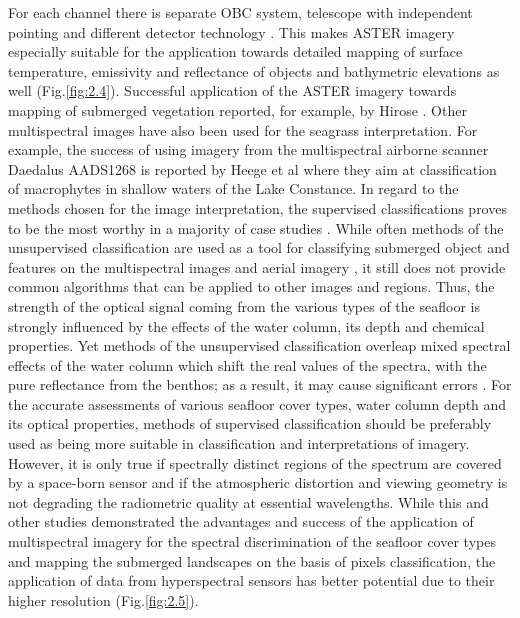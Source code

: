 \documentclass[11pt]{article}
\begin{document}
For each channel there is separate \ac{OBC} system, telescope with independent pointing and different detector technology \cite{Arai05}\label{Arai05}. 
This makes \ac{ASTER}\label{page-19} imagery especially suitable for the application towards detailed
mapping of surface temperature, emissivity and reflectance of objects and bathymetric elevations as
well (Fig.\ref{fig:2.4}). Successful application of the \ac{ASTER} imagery towards mapping of submerged vegetation
reported, for example, by Hirose \cite{Hirose04}\label{Hirose04}. 
Other multispectral images have also been used for the
seagrass interpretation. For example, the success of using imagery from the multispectral airborne
scanner Daedalus AADS1268 is reported by Heege et al \cite{Heege03}\label{Heege03} where they aim at classification of
macrophytes in shallow waters of the Lake Constance. 
In regard to the methods chosen for the image interpretation, the supervised classifications proves to
be the most worthy in a majority of case studies \cite{Palandro03,Peneva08}\label{Palandro03}\label{Peneva08}. While
often methods of the unsupervised classification are used as a tool for classifying submerged object
and features on the multispectral images and aerial imagery \cite{Fletcher09}\label{Fletcher09}, it still does not
provide common algorithms that can be applied to other images and regions. Thus, the strength of the
optical signal coming from the various types of the seafloor is strongly influenced by the effects of the
water column, its depth and chemical properties. Yet methods of the unsupervised classification
overleap mixed spectral effects of the water column which shift the real values of the spectra, with the
pure reflectance from the benthos; as a result, it may cause significant errors \cite{Dierssen03}\label{Dierssen03}.
For the accurate assessments of various seafloor cover types, water
column depth and its optical properties, methods of supervised classification should be preferably
used as being more suitable in classification and interpretations of imagery. 
However, it is only true if spectrally distinct regions of the spectrum are covered by a space-born sensor
 and if the atmospheric distortion and viewing geometry is not degrading the radiometric quality at essential wavelengths.
While this and other studies \cite{Phinn08}\label{Phinn08} demonstrated the advantages and success of the
application of multispectral imagery for the spectral discrimination of the seafloor cover types and
mapping the submerged landscapes on the basis of pixels classification, the application of data from
hyperspectral sensors has better potential due to their higher resolution (Fig.\ref{fig:2.5})\label{page-20}.
\end{document}

